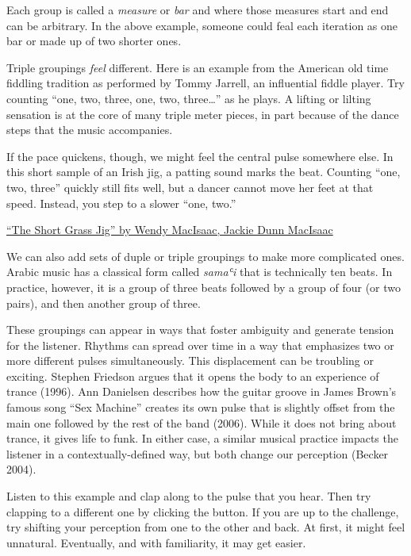 \documentclass[twoside]{article}
\begin{document}
Each group is called a \emph{measure} or \emph{bar} and where those
measures start and end can be arbitrary. In the above example, someone
could feal each iteration as one bar or made up of two shorter ones.

Triple groupings \emph{feel} different. Here is an example from the
American old time fiddling tradition as performed by Tommy Jarrell, an
influential fiddle player. Try counting ``one, two, three, one, two,
three\ldots{}'' as he plays. A lifting or lilting sensation is at the
core of many triple meter pieces, in part because of the dance steps
that the music accompanies.

If the pace quickens, though, we might feel the central pulse somewhere
else. In this short sample of an Irish jig, a patting sound marks the
beat. Counting ``one, two, three'' quickly still fits well, but a dancer
cannot move her feet at that speed. Instead, you step to a slower ``one,
two.''

\href{https://folkways.si.edu/wendy-macisaac-fiddle-jackie-dunn-macisaac-piano/the-short-grassjig/the-braes-of-elchies-jig/traditional-jig/gallaghers-jig/the-pibroch-of-odonal-dubh/celtic-old-time-world/music/track/smithsonian}{``The
Short Grass Jig'' by Wendy MacIsaac, Jackie Dunn MacIsaac}

We can also add sets of duple or triple groupings to make more
complicated ones. Arabic music has a classical form called \emph{samaʿi}
that is technically ten beats. In practice, however, it is a group of
three beats followed by a group of four (or two pairs), and then another
group of three.

\hypertarget{example13}{}

These groupings can appear in ways that foster ambiguity and generate
tension for the listener. Rhythms can spread over time in a way that
emphasizes two or more different pulses simultaneously. This
displacement can be troubling or exciting. Stephen Friedson argues that
it opens the body to an experience of trance (1996). Ann Danielsen
describes how the guitar groove in James Brown's famous song ``Sex
Machine'' creates its own pulse that is slightly offset from the main
one followed by the rest of the band (2006). While it does not bring
about trance, it gives life to funk. In either case, a similar musical
practice impacts the listener in a contextually-defined way, but both
change our perception (Becker 2004).

Listen to this example and clap along to the pulse that you hear. Then
try clapping to a different one by clicking the button. If you are up to
the challenge, try shifting your perception from one to the other and
back. At first, it might feel unnatural. Eventually, and with
familiarity, it may get easier.
\end{document}
